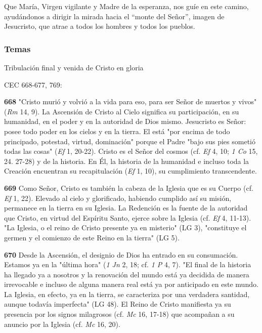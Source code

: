 \documentclass[]{article}
\begin{document}
Que María, Virgen vigilante y Madre de la esperanza, nos guíe en este camino, ayudándonos a dirigir la mirada hacia el ``monte del Señor'', imagen de Jesucristo, que atrae a todos los hombres y todos los pueblos.

\protect\hypertarget{_Toc448709347}{}{\protect\hypertarget{_Toc449554349}{}{}}

\subsubsection{Temas}\label{temas}

Tribulación final  y venida de Cristo en gloria

CEC 668-677, 769:

\textbf{668} "Cristo murió y volvió a la vida para eso, para ser Señor de muertos y vivos" (\emph{Rm} 14, 9). La Ascensión de Cristo al Cielo significa su participación, en su humanidad, en el poder y en la autoridad de Dios mismo. Jesucristo es Señor: posee todo poder en los cielos y en la tierra. El está "por encima de todo principado, potestad, virtud, dominación" porque el Padre "bajo sus pies sometió todas las cosas" (\emph{Ef} 1, 20-22). Cristo es el Señor del cosmos (cf. \emph{Ef} 4, 10; \emph{1 Co} 15, 24. 27-28) y de la historia. En Él, la historia de la humanidad e incluso toda la Creación encuentran su recapitulación (\emph{Ef} 1, 10), su cumplimiento transcendente.

\textbf{669} Como Señor, Cristo es también la cabeza de la Iglesia que es su Cuerpo (cf. \emph{Ef} 1, 22). Elevado al cielo y glorificado, habiendo cumplido así su misión, permanece en la tierra en su Iglesia. La Redención es la fuente de la autoridad que Cristo, en virtud del Espíritu Santo, ejerce sobre la Iglesia (cf. \emph{Ef} 4, 11-13). "La Iglesia, o el reino de Cristo presente ya en misterio" (LG 3), "constituye el germen y el comienzo de este Reino en la tierra" (LG 5).

\textbf{670} Desde la Ascensión, el designio de Dios ha entrado en su consumación. Estamos ya en la "última hora" (\emph{1 Jn} 2, 18; cf. \emph{1 P} 4, 7). "El final de la historia ha llegado ya a nosotros y la renovación del mundo está ya decidida de manera irrevocable e incluso de alguna manera real está ya por anticipado en este mundo. La Iglesia, en efecto, ya en la tierra, se caracteriza por una verdadera santidad, aunque todavía imperfecta" (LG 48). El Reino de Cristo manifiesta ya su presencia por los signos milagrosos (cf. \emph{Mc} 16, 17-18) que acompañan a su anuncio por la Iglesia (cf. \emph{Mc} 16, 20).
\end{document}
